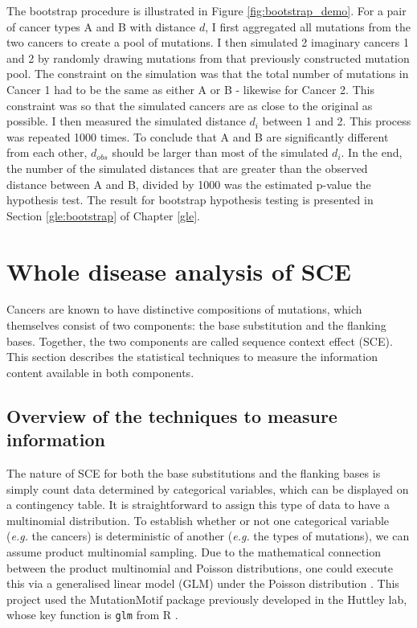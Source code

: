 The bootstrap procedure is illustrated in Figure \ref{fig:bootstrap_demo}. For a pair of cancer types A and B with distance $d$, I first aggregated all mutations from the two cancers to create a pool of mutations. I then simulated 2 imaginary cancers 1 and 2 by randomly drawing mutations from that previously constructed mutation pool. The constraint on the simulation was that the total number of mutations in Cancer 1 had to be the same as either A or B - likewise for Cancer 2. This constraint was so that the simulated cancers are as close to the original as possible. I then measured the simulated distance $d_i$ between 1 and 2. This process was repeated 1000 times. To conclude that A and B are significantly different from each other, $d_{obs}$ should be larger than most of the simulated $d_i$. In the end, the number of the simulated distances that are greater than the observed distance between A and B, divided by 1000 was the estimated p-value the hypothesis test. The result for bootstrap hypothesis testing is presented in Section \ref{gle:bootstrap} of Chapter \ref{gle}.



\section{Whole disease analysis of SCE}\label{methods:sce}
Cancers are known to have distinctive compositions of mutations, which themselves consist of two components: the base substitution and the flanking bases. Together, the two components are called sequence context effect (SCE). This section describes the statistical techniques  to measure the information content available in both components.

\subsection{Overview of the techniques to measure information}
The nature of SCE for both the base substitutions and the flanking bases is simply count data determined by categorical variables, which can be displayed on a contingency table. It is straightforward to assign this type of data to have a multinomial distribution. To establish whether or not one categorical variable (\textit{e.g.} the cancers) is deterministic of another (\textit{e.g.} the types of mutations), we can assume product multinomial sampling. Due to the mathematical connection between the product multinomial and Poisson distributions, one could execute this  via a generalised linear model (GLM) under the Poisson distribution \citep{Nelder1974LOGSQUARES.}. This project used the MutationMotif package previously developed in the Huttley lab, whose key function is \texttt{glm} from R \citep{Zhu2017}.

